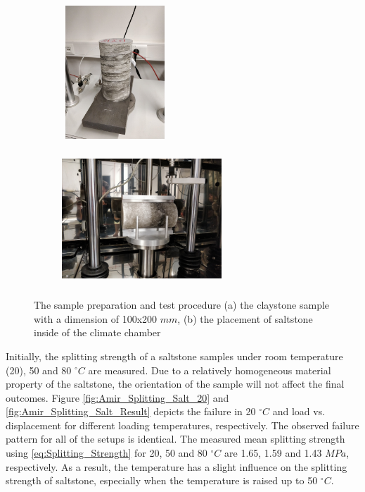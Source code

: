 \begin{figure}[!ht]
\centering
\begin{subfigure}[c]{0.3\textwidth}
\centering
\includegraphics[width=4cm,height=5cm]{figures/Amir_Splitting_Sample.png}
\subcaption{}
\label{fig:Amir_Splitting_Sample}
\end{subfigure}
\hfill
\begin{subfigure}[c]{0.6\textwidth}
\centering
\includegraphics[width=6cm,height=5cm]{figures/Amir_Splitting_Setup.png}
\subcaption{}
\label{fig:Amir_Splitting_Setup}
\end{subfigure}
\caption{The sample preparation and test procedure (a) the claystone sample with a dimension of 100x200 $mm$, (b) the placement of saltstone inside of the climate chamber}
\end{figure}

Initially, the splitting strength of a saltstone samples under room temperature (20), 50 and 80 $^{\circ}C$ are measured. Due to a relatively homogeneous material property of the saltstone, the orientation of the sample will not affect the final outcomes. Figure \ref{fig:Amir_Splitting_Salt_20} and \ref{fig:Amir_Splitting_Salt_Result} depicts the failure in 20 $^{\circ}C$ and load vs. displacement for different loading temperatures, respectively. The observed failure pattern for all of the setups is identical. The measured mean splitting strength using \ref{eq:Splitting_Strength} for 20, 50 and 80 $^{\circ}C$ are 1.65, 1.59 and 1.43 $MPa$, respectively. As a result, the temperature has a slight influence on the splitting strength of saltstone, especially when the temperature is raised up to 50 $^{\circ}C$.

